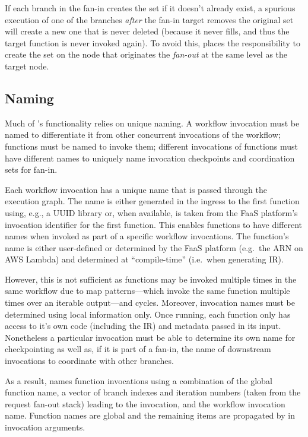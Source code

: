 If each branch in the fan-in creates the set if it doesn't already exist, a
spurious execution of one of the branches \emph{after} the fan-in target removes
the original set will create a new one that is never deleted (because it never
fills, and thus the target function is never invoked again). To avoid this,
\name{} places the responsibility to create the set on the node that originates
the \emph{fan-out} at the same level as the target node.

\subsection{Naming}\label{sec:design:naming}

Much of \name{}'s functionality relies on unique naming. A workflow invocation
must be named to differentiate it from other concurrent invocations of the
workflow; functions must be named to invoke them; different invocations of
functions must have different names to uniquely name invocation checkpoints and
coordination sets for fan-in.

Each workflow invocation has a unique name that is passed through the execution
graph. The name is either generated in the ingress to the first function using,
e.g., a UUID library or, when available, is taken from the FaaS platform's
invocation identifier for the first function. This enables functions to have
different names when invoked as part of a specific workflow invocations. The
function's name is either user-defined or determined by the FaaS platform (e.g.\
the ARN on AWS Lambda) and determined at ``compile-time'' (i.e.\ when generating
\name{} IR).

However, this is not sufficient as functions may be invoked multiple times in
the same workflow due to map patterns---which invoke the same function multiple
times over an iterable output---and cycles. Moreover, invocation names must be
determined using local information only. Once running, each function only has
access to it's own code (including the IR) and metadata passed in its input.
Nonetheless a particular invocation must be able to determine its own name for
checkpointing as well as, if it is part of a fan-in, the name of downstream
invocations to coordinate with other branches.

As a result, \name{} names function invocations using a combination of the
global function name, a vector of branch indexes and iteration numbers (taken
from the \name{} request fan-out stack) leading to the invocation, and the
workflow invocation name. Function names are global and the remaining items are
propagated by \name{} in invocation arguments.

